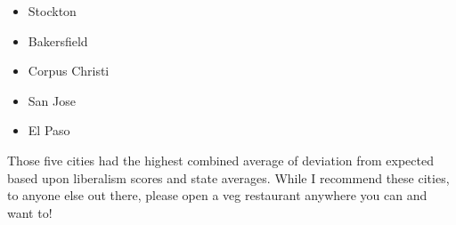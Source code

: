 \documentclass[
]{article}
\providecommand{\tightlist}{%
  \setlength{\itemsep}{0pt}\setlength{\parskip}{0pt}}
\begin{document}
\begin{itemize}
\tightlist
\item
  Stockton
\item
  Bakersfield
\item
  Corpus Christi
\item
  San Jose
\item
  El Paso
\end{itemize}

Those five cities had the highest combined average of deviation from
expected based upon liberalism scores and state averages. While I
recommend these cities, to anyone else out there, please open a veg
restaurant anywhere you can and want to!
\end{document}

